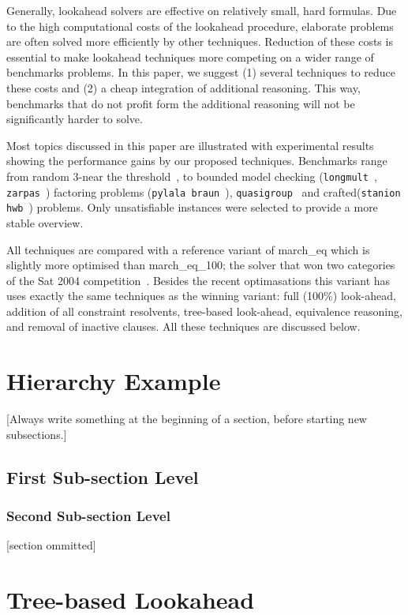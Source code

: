 \documentclass[twoside,11pt]{article}
\begin{document}
Generally, lookahead \Sat solvers are effective on relatively small, hard formulas. 
Due to the high computational costs of the lookahead procedure, elaborate
problems are often solved more efficiently by other techniques. Reduction of
these costs is essential to make lookahead techniques more competing on a wider
range of benchmarks problems. In this paper, we suggest (1) several techniques
to reduce these costs and (2) a cheap integration of additional reasoning. This way, 
benchmarks that do not profit form the additional reasoning will not be
significantly harder to solve.

Most topics discussed in this paper are illustrated with experimental results showing the 
performance gains by our proposed techniques. Benchmarks range from random 3-\Sat near the 
threshold~\cite{Mitchell:1992}, to bounded model checking ({\tt longmult}~\cite{Biere:1999},
{\tt zarpas}~\cite{LeBerre:2003}) factoring problems ({\tt pylala braun}~\cite{Simon:2002}), 
{\tt quasigroup}~\cite{Zhang:2000} and crafted({\tt stanion hwb}~\cite{LeBerre:2003}) problems. Only unsatisfiable instances
 were selected to provide a more stable overview.

 All techniques are compared with a reference variant of {\sf march\_eq} which is slightly more
 optimised than {\sf march\_eq\_100}; the solver that won two categories of the
 {\sc Sat 2004} competition~\cite{Sat2004}. Besides the recent optimasations this variant has uses exactly
 the  same techniques as the winning variant: full (100\%) look-ahead, addition of all constraint
 resolvents, tree-based look-ahead, equivalence reasoning, and removal of inactive clauses.
 All these techniques are discussed below.

\section{Hierarchy Example}
\label{sec:hierarchy}
[Always write something at the beginning of a section, before starting new subsections.]
\subsection{First Sub-section Level}
\subsubsection{Second Sub-section Level}
[section ommitted]

\section{Tree-based Lookahead}
\label{sec:tree}
\end{document}
